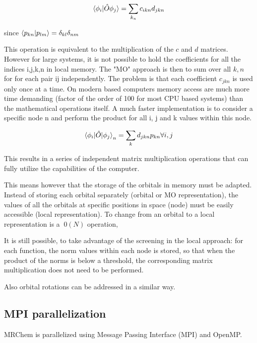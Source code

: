 \documentclass{article}
\begin{document}
\begin{equation}
  \braket{\phi_i|{\hat O} \phi_j} = \sum_{k_n} c_{ikn}d_{jkn}
\end{equation}

since $\braket{p_{kn}|p_{lm}} = \delta_{kl}\delta_{nm}$

This operation is equivalent to the multiplication of the $c$ and $d$ matrices. However for large systems, it is not possible to hold the coefficients for all the indices i,j,k,n in local memory.
The "MO" approach is then to sum over all $k,n$ for for each pair ij independently. The problem is that each coefficient $c_{jkn}$ is used only once at a time. On modern based computers memory access are much more time demanding (factor of the order of 100 for most CPU based systems) than the mathematical operations itself.  A much faster implementation is to consider a specific node n and perform the product for all i, j and k values within this node. 

\begin{equation}
  \braket{\phi_i | {\hat O} |\phi_j}_n = \sum_{k} d_{jkn} p_{kn} \forall i,j
\end{equation}

This results in a series of independent matrix multiplication operations that can fully utilize the capabilities of the computer. 

This means however that the storage of the orbitals in memory must be adapted. Instead of storing each orbital separately (orbital or MO representation), the values of all the orbitals at specific positions in space (node) must be easily accessible (local representation). To change from an orbital to a local representation is a $~0(N)$ operation,

It is still possible, to take advantage of the screening in the local approach: for each function, the norm values within each node is stored, so that when the product of the norms is below a threshold, the corresponding matrix multiplication does not need to be performed.

Also orbital rotations can be addressed in a similar way.


\subsection{MPI parallelization}

MRChem is parallelized using Message Passing Interface (MPI) and OpenMP.  
\end{document}
